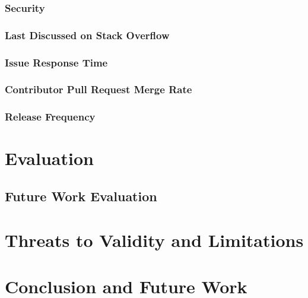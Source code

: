 \documentclass[12pt]{article}
\begin{document}
\subsubsection{Security}
\subsubsection{Last Discussed on Stack Overflow}
\subsubsection{Issue Response Time}
\subsubsection{Contributor Pull Request Merge Rate}
\subsubsection{Release Frequency}

\section{Evaluation}
\subsection{Future Work Evaluation}

\section{Threats to Validity and Limitations}
\section{Conclusion and Future Work}



\newpage


\end{document}
